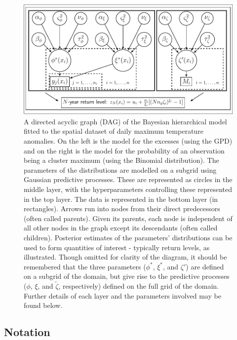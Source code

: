 \documentclass{article}
\begin{document}
\begin{figure}[H]
    \centering
       \includegraphics[width=1\textwidth,keepaspectratio]{cropped-dag.pdf}
      \caption{A directed acyclic graph (DAG) of the Bayesian hierarchical model fitted to the spatial dataset of daily maximum temperature anomalies. On the left is the model for the excesses (using the GPD) and on the right is the model for the probability of an observation being a cluster maximum (using the Binomial distribution). The parameters of the distributions are modelled on a subgrid using Gaussian predictive processes. These are represented as circles in the middle layer, with the hyperparameters controlling these represented in the top layer. The data is represented in the bottom layer (in rectangles). Arrows run into nodes from their direct predecessors (often called parents). Given its parents, each node is independent of all other nodes in the graph except its descendants (often called children). Posterior estimates of the parameters' distributions can be used to form quantities of interest - typically return levels, as illustrated. Though omitted for clarity of the diagram, it should be remembered that the three parameters ($\phi^*$, $\xi^*$, and $\zeta'$) are defined on a subgrid of the domain, but give rise to the predictive processes ($\phi$, $\xi$, and $\tilde{\zeta}$, respectively) defined on the full grid of the domain. Further details of each layer and the parameters involved may be found below.}
      \label{fig:DAG3}
\end{figure}

\clearpage
\subsection*{Notation}
\end{document}
